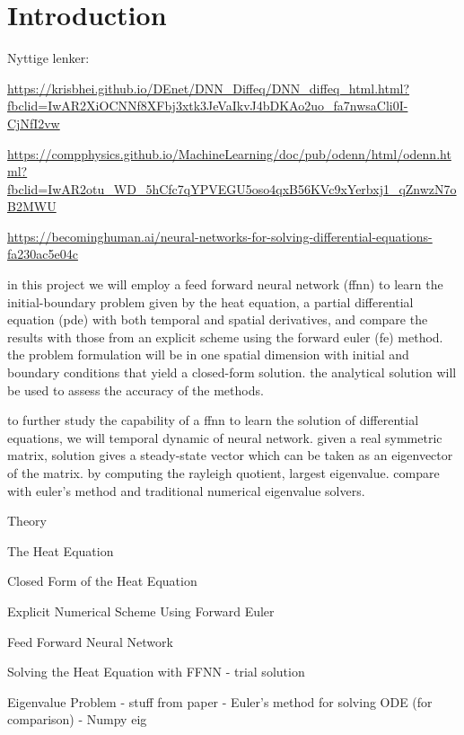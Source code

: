 \section{Introduction}\label{sec:Introduction}

Nyttige lenker:

\url{https://krisbhei.github.io/DEnet/DNN_Diffeq/DNN_diffeq_html.html?fbclid=IwAR2XiOCNNf8XFbj3xtk3JeVaIkvJ4bDKAo2uo_fa7nwsaCli0I-CjNfI2vw}

\url{https://compphysics.github.io/MachineLearning/doc/pub/odenn/html/odenn.html?fbclid=IwAR2otu_WD_5hCfc7qYPVEGU5oso4qxB56KVc9xYerbxj1_qZnwzN7oB2MWU}

\url{https://becominghuman.ai/neural-networks-for-solving-differential-equations-fa230ac5e04c} 

in this project we will employ a feed forward neural network (ffnn) to learn the initial-boundary problem given by the heat equation, a partial differential equation (pde) with both temporal and spatial derivatives, and compare the results with those from an explicit scheme using the forward euler (fe) method. the problem formulation will be in one spatial dimension with initial and boundary conditions that yield a closed-form solution. the analytical solution will be used to assess the accuracy of the methods. 

to further study the capability of a ffnn to learn the solution of differential equations, we will 
temporal dynamic of neural network. given a real symmetric matrix, solution gives a steady-state vector which can be taken as an eigenvector of the matrix. by computing the rayleigh quotient, largest eigenvalue.
compare with euler's method and traditional numerical eigenvalue solvers.


Theory

The Heat Equation 

Closed Form of the Heat Equation

Explicit Numerical Scheme Using Forward Euler

Feed Forward Neural Network

Solving the Heat Equation with FFNN 
- trial solution

Eigenvalue Problem
- stuff from paper
- Euler's method for solving ODE (for comparison)
- Numpy eig
